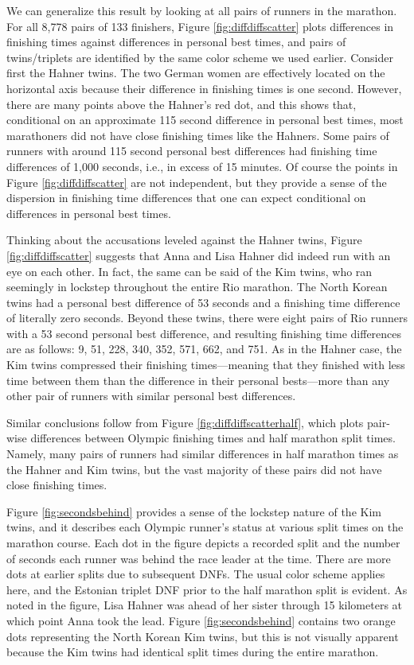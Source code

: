 \documentclass[12pt,titlepage]{article}
\begin{document}
We can generalize this result by looking at all pairs of runners in
the marathon.  For all 8,778 pairs of 133 finishers, Figure
\ref{fig:diffdiffscatter} plots differences in finishing times against
differences in personal best times, and pairs of twins/triplets are
identified by the same color scheme we used earlier.  Consider first
the Hahner twins.  The two German women are effectively located on the
horizontal axis because their difference in finishing times is one
second.  However, there are many points above the Hahner's red dot,
and this shows that, conditional on an approximate 115 second
difference in personal best times, most marathoners did not have close
finishing times like the Hahners.  Some pairs of runners with around
115 second personal best differences had finishing time differences of
1,000 seconds, i.e., in excess of 15 minutes.  Of course the points in
Figure \ref{fig:diffdiffscatter} are not independent, but they provide
a sense of the dispersion in finishing time differences that one can
expect conditional on differences in personal best times.

Thinking about the accusations leveled against the Hahner twins,
Figure \ref{fig:diffdiffscatter} suggests that Anna and Lisa Hahner
did indeed run with an eye on each other.  In fact, the same can be
said of the Kim twins, who ran seemingly in lockstep throughout the
entire Rio marathon.  The North Korean twins had a personal best
difference of 53 seconds and a finishing time difference of literally
zero seconds.  Beyond these twins, there were eight pairs of Rio
runners with a 53 second personal best difference, and resulting
finishing time differences are as follows: 9, 51, 228, 340, 352, 571,
662, and 751.  As in the Hahner case, the Kim twins compressed their
finishing times---meaning that they finished with less time between
them than the difference in their personal bests---more than any other
pair of runners with similar personal best differences.

Similar conclusions follow from Figure \ref{fig:diffdiffscatterhalf},
which plots pair-wise differences between Olympic finishing times and
half marathon split times.  Namely, many pairs of runners had similar
differences in half marathon times as the Hahner and Kim twins, but
the vast majority of these pairs did not have close finishing times.

Figure \ref{fig:secondsbehind} provides a sense of the lockstep nature
of the Kim twins, and it describes each Olympic runner's status at
various split times on the marathon course.  Each dot in the figure
depicts a recorded split and the number of seconds each runner was
behind the race leader at the time.  There are more dots at earlier
splits due to subsequent DNFs.  The usual color scheme applies here,
and the Estonian triplet DNF prior to the half marathon split is
evident. As noted in the figure, Lisa Hahner was ahead of her sister
through 15 kilometers at which point Anna took the lead.  Figure
\ref{fig:secondsbehind} contains two orange dots representing the North
Korean Kim twins, but this is not visually apparent because the Kim
twins had identical split times during the entire marathon.
\end{document}
